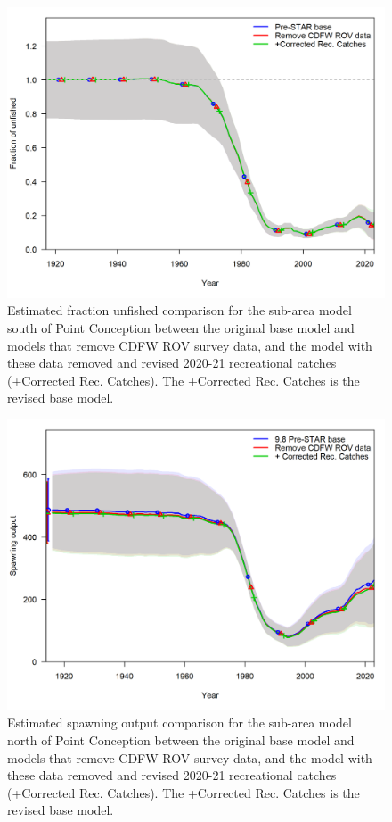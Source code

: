 \documentclass[
  letterpaper,
]{article}
\begin{document}
\pagebreak

\begin{figure}
\centering
\includegraphics[width=1\textwidth,height=1\textheight]{14.3_corrected_base_compare4_Bratio_uncertainty.png}
\caption{Estimated fraction unfished comparison for the sub-area model south of Point Conception between the original base model and models that remove CDFW ROV survey data, and the model with these data removed and revised 2020-21 recreational catches (+Corrected Rec. Catches). The +Corrected Rec. Catches is the revised base model.\label{fig:south-depl}}
\end{figure}

\pagebreak

\begin{figure}
\centering
\includegraphics[width=1\textwidth,height=1\textheight]{9.10_corrected_base_compare2_spawnbio_uncertainty.png}
\caption{Estimated spawning output comparison for the sub-area model north of Point Conception between the original base model and models that remove CDFW ROV survey data, and the model with these data removed and revised 2020-21 recreational catches (+Corrected Rec. Catches). The +Corrected Rec. Catches is the revised base model.\label{fig:north-ssb}}
\end{figure}
\end{document}
